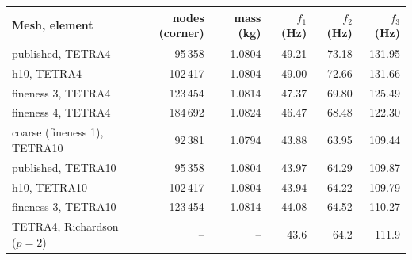 \begin{tabular}{lrrrrr}
\toprule
Mesh, element & nodes (corner) & mass (kg) & $f_1$ (Hz) & $f_2$ (Hz) & $f_3$ (Hz) \\
\midrule
published, TETRA4 & 95\,358 & 1.0804 & 49.21 & 73.18 & 131.95 \\
h10, TETRA4 & 102\,417 & 1.0804 & 49.00 & 72.66 & 131.66 \\
fineness 3, TETRA4 & 123\,454 & 1.0814 & 47.37 & 69.80 & 125.49 \\
fineness 4, TETRA4 & 184\,692 & 1.0824 & 46.47 & 68.48 & 122.30 \\
coarse (fineness 1), TETRA10 & 92\,381 & 1.0794 & 43.88 & 63.95 & 109.44 \\
published, TETRA10 & 95\,358 & 1.0804 & 43.97 & 64.29 & 109.87 \\
h10, TETRA10 & 102\,417 & 1.0804 & 43.94 & 64.22 & 109.79 \\
fineness 3, TETRA10 & 123\,454 & 1.0814 & 44.08 & 64.52 & 110.27 \\
\midrule
TETRA4, Richardson ($p=2$) & -- & -- & 43.6 & 64.2 & 111.9 \\
\bottomrule
\end{tabular}
